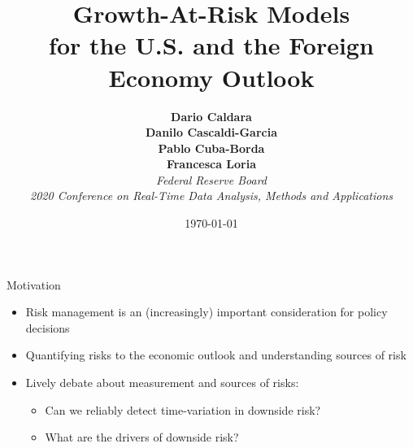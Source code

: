 \documentclass[xcolor=dvipsnames, xcolor=table, 10pt]{beamer}
\begin{document}

\title[Growth-At-Risk Models]{\textbf{Growth-At-Risk Models\\ for the U.S. and the Foreign Economy Outlook}}
\thispagestyle{empty}
\author[Caldara, Cascaldi-Garcia, Cuba-Borda, Loria]{\textbf{Dario Caldara \\ Danilo Cascaldi-Garcia \\ Pablo Cuba-Borda \\ Francesca Loria }\\ \medskip \emph{Federal Reserve Board} \\ \bigskip \bigskip
\emph{2020 Conference on Real-Time Data Analysis, Methods and Applications}}

\date{\today}
\maketitle




\begin{frame}{Motivation}
\begin{itemize}
\item Risk management is an (increasingly) important consideration for policy decisions
\medskip
\item Quantifying risks to the economic outlook and understanding sources of risk
\medskip
\item Lively debate about measurement and sources of risks:
\medskip
  \begin{itemize}
  \item Can we reliably detect time-variation in downside risk?
  \medskip
  \item What are the drivers of downside risk?
  \end{itemize}
\end{itemize}

\end{frame}


\end{document}
